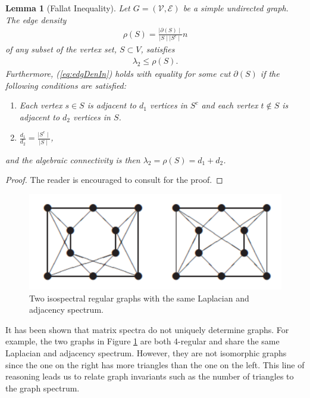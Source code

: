 \documentclass{amsart}
\newtheorem{lemma}{Lemma}
\theoremstyle{definition}
\theoremstyle{remark}
\numberwithin{equation}{section}
\def\cV{\mathcal{V}}
\def\cE{\mathcal{E}}
\begin{document}
\begin{lemma}[Fallat Inequality]\label{lem:minedgedenalgconnect}
Let $G = (\cV,\cE)$ be a simple undirected graph. The edge density 
\begin{align*}
\rho (S) = \frac{\mid \partial(S) \mid}{\mid S \mid \mid S^c \mid}n
\end{align*}
of any subset of the vertex set, $S \subset V$, satisfies
\begin{align} \label{eq:edgDenIn}
\lambda_2 \leq \rho(S).
\end{align}
Furthermore, (\ref{eq:edgDenIn}) holds with equality for some cut $\partial (S)$ if the following conditions are satisfied: 
\begin{enumerate}
\item[i)] Each vertex $s \in S$ is adjacent to $d_1$ vertices in $S^c$ and each vertex $t \notin S$ is adjacent to $d_2$ vertices in $S$.
\item[ii)] $\displaystyle \frac{d_1}{d_2} = \frac{\mid S^c \mid}{\mid S \mid}$, 
\end{enumerate}
and the algebraic connectivity is then $\lambda_2 = \rho(S) = d_1+d_2$.
\end{lemma}
\begin{proof}
The reader is encouraged to consult \cite{Fallat2003} for the proof.
\end{proof}
\begin{figure}
    \centering
    \includegraphics{cospectral.png}
    \caption{Two isospectral regular graphs with the same Laplacian and adjacency spectrum.}
    \label{fig:cospectral}
\end{figure}
It has been shown that matrix spectra do not uniquely determine graphs. For example, the two graphs in Figure \ref{fig:cospectral} are both 4-regular and share the same Laplacian and adjacency spectrum. However, they are not isomorphic graphs since the one on the right has more triangles than the one on the left. This line of reasoning leads us to relate graph invariants such as the number of triangles to the graph spectrum. 
\end{document}
